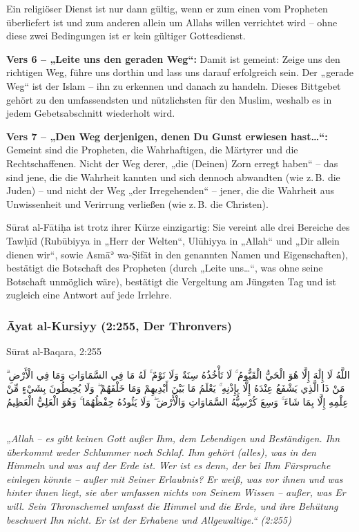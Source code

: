 Ein religiöser Dienst ist nur dann gültig, wenn er zum einen vom Propheten  überliefert
ist und zum anderen allein um Allahs willen verrichtet wird – ohne diese zwei Bedingungen ist
er kein gültiger Gottesdienst.

\textbf{Vers 6 – „Leite uns den geraden Weg“:} Damit ist gemeint: Zeige uns den richtigen Weg,
führe uns dorthin und lass uns darauf erfolgreich sein. Der „gerade Weg“ ist der Islam – ihn zu
erkennen und danach zu handeln. Dieses Bittgebet gehört zu den umfassendsten und
nützlichsten für den Muslim, weshalb es in jedem Gebetsabschnitt wiederholt wird.

\textbf{Vers 7 – „Den Weg derjenigen, denen Du Gunst erwiesen hast\ldots{}“:} Gemeint sind die
Propheten, die Wahrhaftigen, die Märtyrer und die Rechtschaffenen. Nicht der Weg derer, „die
(Deinen) Zorn erregt haben“ – das sind jene, die die Wahrheit kannten und sich dennoch
abwandten (wie z.\,B. die Juden) – und nicht der Weg „der Irregehenden“ – jener, die die
Wahrheit aus Unwissenheit und Verirrung verließen (wie z.\,B. die Christen).

\begin{merke}
Sūrat al-Fātiḥa ist trotz ihrer Kürze einzigartig: Sie vereint alle drei Bereiche des Tawḥīd
(Rubūbiyya in „Herr der Welten“, Ulūhiyya in „Allah“ und „Dir allein dienen wir“, sowie Asmāʾ
wa-Ṣifāt in den genannten Namen und Eigenschaften), bestätigt die Botschaft des Propheten
 (durch „Leite uns\ldots{}“, was ohne seine Botschaft unmöglich wäre), bestätigt die
Vergeltung am Jüngsten Tag und ist zugleich eine Antwort auf jede Irrlehre.
\end{merke}

\subsubsection*{Āyat al-Kursiyy (2:255, Der Thronvers)}

\begin{quranvers}{Sūrat al-Baqara, 2:255}
{\quranfont\begin{Arabic}
اللَّهُ لَا إِلَٰهَ إِلَّا هُوَ الْحَيُّ الْقَيُّومُ ۚ لَا تَأْخُذُهُ سِنَةٌ وَلَا نَوْمٌ ۚ لَهُ مَا فِي السَّمَاوَاتِ وَمَا فِي الْأَرْضِ ۗ مَنْ ذَا الَّذِي يَشْفَعُ عِنْدَهُ إِلَّا بِإِذْنِهِ ۚ يَعْلَمُ مَا بَيْنَ أَيْدِيهِمْ وَمَا خَلْفَهُمْ ۖ وَلَا يُحِيطُونَ بِشَيْءٍ مِّنْ عِلْمِهِ إِلَّا بِمَا شَاءَ ۚ وَسِعَ كُرْسِيُّهُ السَّمَاوَاتِ وَالْأَرْضَ ۖ وَلَا يَئُودُهُ حِفْظُهُمَا ۚ وَهُوَ الْعَلِيُّ الْعَظِيمُ
\end{Arabic}}\\[3mm]
\emph{„Allah – es gibt keinen Gott außer Ihm, dem Lebendigen und Beständigen. Ihn überkommt
weder Schlummer noch Schlaf. Ihm gehört (alles), was in den Himmeln und was auf der Erde ist.
Wer ist es denn, der bei Ihm Fürsprache einlegen könnte – außer mit Seiner Erlaubnis? Er weiß,
was vor ihnen und was hinter ihnen liegt, sie aber umfassen nichts von Seinem Wissen – außer,
was Er will. Sein Thronschemel umfasst die Himmel und die Erde, und ihre Behütung beschwert
Ihn nicht. Er ist der Erhabene und Allgewaltige.“ (2:255)}
\end{quranvers}

